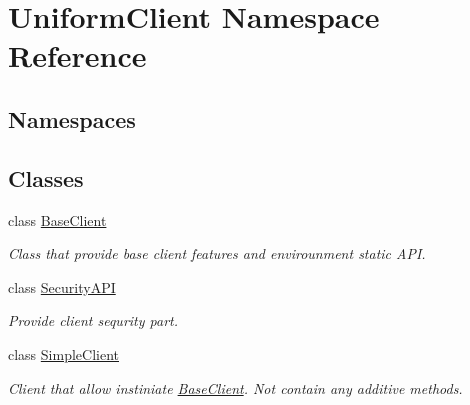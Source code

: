 \hypertarget{namespace_uniform_client}{}\section{Uniform\+Client Namespace Reference}
\label{namespace_uniform_client}
\subsection*{Namespaces}
\begin{DoxyCompactItemize}
\end{DoxyCompactItemize}
\subsection*{Classes}
\begin{DoxyCompactItemize}
\item 
class \mbox{\hyperlink{class_uniform_client_1_1_base_client}{Base\+Client}}
\begin{DoxyCompactList}\small\item\em Class that provide base client features and envirounment static A\+PI. \end{DoxyCompactList}\item 
class \mbox{\hyperlink{class_uniform_client_1_1_security_a_p_i}{Security\+A\+PI}}
\begin{DoxyCompactList}\small\item\em Provide client sequrity part. \end{DoxyCompactList}\item 
class \mbox{\hyperlink{class_uniform_client_1_1_simple_client}{Simple\+Client}}
\begin{DoxyCompactList}\small\item\em Client that allow instiniate \mbox{\hyperlink{class_uniform_client_1_1_base_client}{Base\+Client}}. Not contain any additive methods. \end{DoxyCompactList}\end{DoxyCompactItemize}

